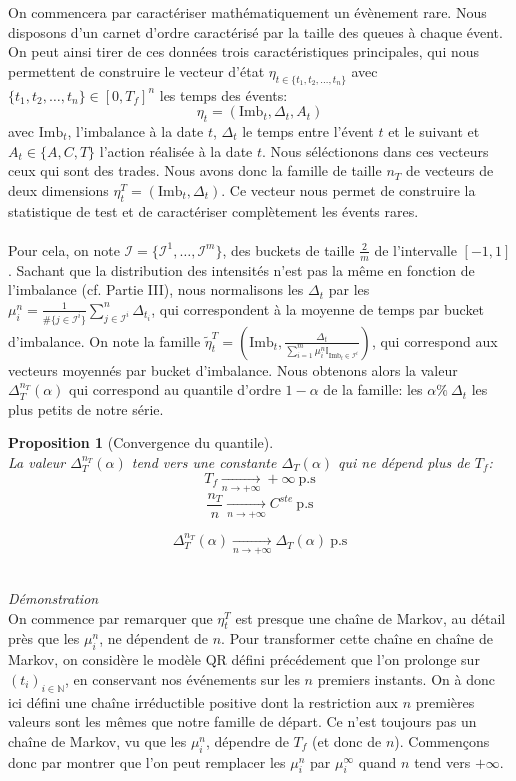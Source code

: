 \documentclass[12pt,a4paper]{article}
\newtheorem{proposition}[theorem]{Proposition}
\theoremstyle{definition}
\theoremstyle{remark}
\begin{document}
On commencera par caractériser mathématiquement un évènement rare. Nous disposons d'un carnet d'ordre caractérisé par la taille des queues à chaque évent. On peut ainsi tirer de ces données trois caractéristiques principales, qui nous permettent de construire le vecteur d'état $\eta_{t\in \{t_1,t_2,\dots,t_n\}}$ avec $\{t_1,t_2,\dots,t_n\}\in [0,T_f]^n$ les temps des évents:
$$\eta_t = (\text{Imb}_t, \Delta_t, {A_t})$$
avec $\text{Imb}_t$, l'imbalance à la date $t$, $\Delta_t$ le temps entre l'évent $t$ et le suivant et $A_t\in \{A,C,T\}$ l'action réalisée à la date $t$. Nous séléctionons dans ces vecteurs ceux qui sont des trades. Nous avons donc la famille de taille $n_T$ de vecteurs de deux dimensions $\eta_t^T = (\text{Imb}_t, \Delta_t)$.
Ce vecteur nous permet de construire la statistique de test et de caractériser complètement les évents rares.
\\
\\
Pour cela, on note $\mathcal I= \{\mathcal I^1,\dots,\mathcal I^m\}$, des buckets de taille $\frac{2}{m}$ de l'intervalle $[-1,1]$. Sachant que la distribution des intensités n'est pas la même en fonction de l'imbalance (cf. Partie III), nous normalisons les $\Delta_t$ par les $\mu_i^n = \frac{1}{\#\{j\in \mathcal I^i\}}\sum_{j\in \mathcal I^i}^n\Delta_{t_i}$, qui correspondent à la moyenne de temps par bucket d'imbalance.
On note la famille $\tilde \eta_t^T = \left(\text{Imb}_t, \frac{\Delta_t}{\sum_{i=1}^m\mu_i^n\mathbb{I}_{\text{Imb}_t\in\mathcal{I}^{i}}}\right)$, qui correspond aux vecteurs moyennés par bucket d'imbalance.
Nous obtenons alors la valeur $\Delta_T^{n_T}(\alpha)$ qui correspond au quantile d'ordre $1-\alpha$ de la famille: les $\alpha\% \ \Delta_t$ les plus petits de notre série.
\\
\begin{proposition}[Convergence du quantile]
\\
La valeur $\Delta_T^{n_T}(\alpha)$ tend vers une constante $\Delta_T(\alpha)$ qui ne dépend plus de $T_f$:
$$T_f\underset{n\to +\infty}{\to}+\infty \ \text{p.s}$$
$$\frac{n_T}{n}\underset{n\to +\infty}{\to}C^{ste} \ \text{p.s}$$

$$\Delta_T^{n_T}(\alpha)\underset{n\to +\infty}{\to}\Delta_T(\alpha) \ \text{p.s}$$
\end{proposition}
\\
\textit{Démonstration}
\\
On commence par remarquer que $\eta_t^T$ est presque une chaîne de Markov, au détail près que les $\mu_i^n$, ne dépendent de 
$n$.  Pour transformer cette chaîne en chaîne de Markov, on considère le modèle QR défini précédement que l'on prolonge sur $(t_i)_{i\in\mathbb{N}}$, en conservant nos événements sur les $n$ premiers instants. On à donc ici défini une chaîne irréductible positive dont la restriction aux $n$ premières valeurs sont les mêmes que notre famille de départ. Ce n'est toujours pas un chaîne de Markov, vu que les $\mu_i^n$, dépendre de $T_f$ (et donc de $n$). Commençons donc par montrer que l'on peut remplacer les $\mu_i^n$ par $\mu_i^{\infty}$ quand $n$ tend vers $+\infty$.
\end{document}
